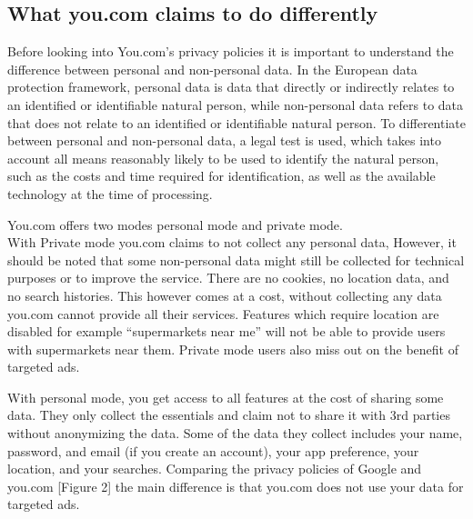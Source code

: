 \documentclass[5p,twocolumn,final]{elsarticle}
\begin{document}
\subsection{What you.com claims to do differently}
Before looking into You.com's privacy policies it is important to understand the difference between personal and non-personal data. In the European data protection framework, personal data is data that directly or indirectly relates to an identified or identifiable natural person, while non-personal data refers to data that does not relate to an identified or identifiable natural person. To differentiate between personal and non-personal data, a legal test is used, which takes into account all means reasonably likely to be used to identify the natural person, such as the costs and time required for identification, as well as the available technology at the time of processing.~\cite{pallas2020}\par
%
You.com offers two modes personal mode and private mode.\\
 With Private mode you.com claims to not collect any personal data,  However, it should be noted that some non-personal data might still be collected for technical purposes or to improve the service. There are no cookies, no location data, and no search histories. This however comes at a cost, without collecting any data you.com cannot provide all their services. Features which require location are disabled for example “supermarkets near me” will not be able to provide users with supermarkets near them. Private mode users also miss out on the benefit of targeted ads.\par 
 With personal mode, you get access to all features at the cost of sharing some data. They only collect the essentials and claim not to share it with 3rd parties without anonymizing the data. Some of the data they collect includes your name, password, and email (if you create an account), your app preference, your location, and your searches. Comparing the privacy policies of Google and you.com [Figure 2] the main difference is that you.com does not use your data for targeted ads.
\end{document}
